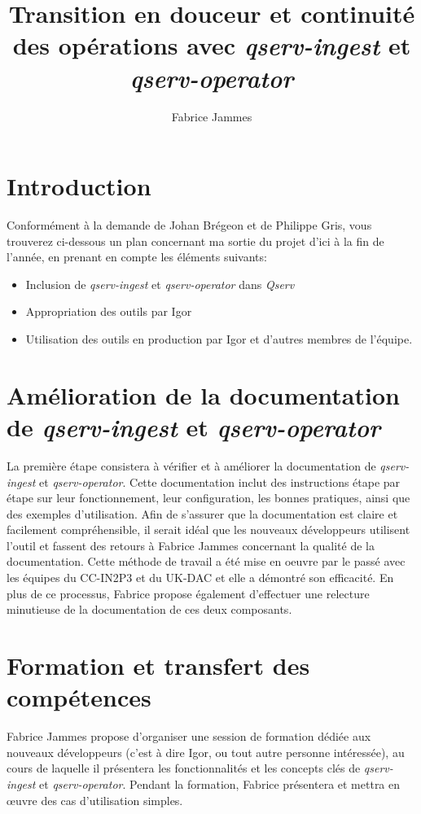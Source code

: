 \documentclass[french]{article}
\title{Transition en douceur et continuité des opérations avec \textit{qserv-ingest} et \textit{qserv-operator}}
\author{Fabrice Jammes}
\begin{document}
	
	\maketitle
	
	\section{Introduction}
	
	Conformément à la demande de Johan Brégeon et de Philippe Gris, vous trouverez ci-dessous un plan concernant ma sortie du projet d'ici à la fin de l'année, en prenant en compte les éléments suivants: 
	
	\begin{itemize}
		\item Inclusion de \textit{qserv-ingest} et \textit{qserv-operator} dans \textit{Qserv}
		\item Appropriation des outils par Igor
		\item Utilisation des outils en production par Igor et d'autres membres de l'équipe.
	\end{itemize}

	\section{Amélioration de la documentation de \textit{qserv-ingest} et \textit{qserv-operator}}
	
	La première étape consistera à vérifier et à améliorer la documentation de \textit{qserv-ingest} et \textit{qserv-operator}. Cette documentation inclut des instructions étape par étape sur leur fonctionnement, leur configuration, les bonnes pratiques, ainsi que des exemples d'utilisation. Afin de s'assurer que la documentation est claire et facilement compréhensible, il serait idéal que les nouveaux développeurs utilisent l'outil et fassent des retours à Fabrice Jammes concernant la qualité de la documentation. Cette méthode de travail a été mise en oeuvre par le passé avec les équipes du CC-IN2P3 et du UK-DAC et elle a démontré son efficacité. En plus de ce processus, Fabrice propose également d'effectuer une relecture minutieuse de la documentation de ces deux composants.
	
	\section{Formation et transfert des compétences}
	
	Fabrice Jammes propose d'organiser une session de formation dédiée aux nouveaux développeurs (c'est à dire Igor, ou tout autre personne intéressée), au cours de laquelle il présentera les fonctionnalités et les concepts clés de \textit{qserv-ingest} et \textit{qserv-operator}. Pendant la formation, Fabrice présentera et mettra en œuvre des cas d'utilisation simples.
	
\end{document}
